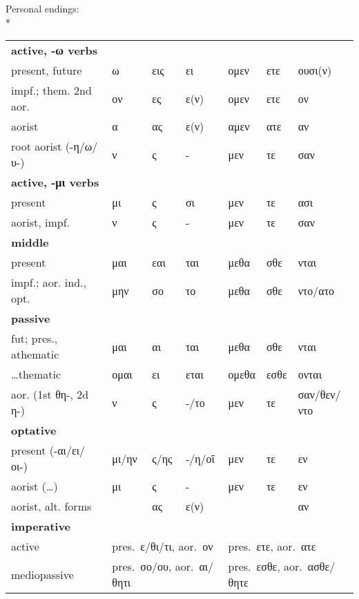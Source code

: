 \begin{small}
Personal endings:\\*
%
\begin{tabular}{lllllll}
\textbf{active, -ω verbs}\\
present, future              & ω      & εις\footnotemark  & ει\footnotemark[3]  & ομεν    & ετε    & ουσι(ν) \\
impf.; them. 2nd aor.        & ον\footnotemark[4] & ες      & ε(ν)      & ομεν    &	ετε    & ον\footnotemark[4] \\
aorist                       & α      & ας      & ε(ν)      & αμεν    & ατε    & αν\footnotemark[5] \\
root aorist (-η/ω/υ-)        & \tca{}ν & \tca{}ς  & \tca{}-  & \tca{}μεν & \tca{}τε & \tca{}σαν \\
\textbf{active, -μι verbs}\\
present                      & μι     & ς       & σι        & μεν     & τε     & ασι \\
aorist, impf.                & \tca{}ν & \tca{}ς  & \tca{}-  & \tca{}μεν & \tca{}τε & \tca{}σαν \\
\textbf{middle}\\
present                      & \tcb{}μαι & εαι  & \tcb{}ται & \tcb{}μεθα & \tcb{}σθε & \tcb{}νται \\
impf.; aor. ind., opt.       & μην    & σο      & το        & μεθα    &	σθε    & ντο/ατο\\
\textbf{passive}\\
fut; pres., athematic        & \tcb{}μαι  & αι  & \tcb{}ται & \tcb{}μεθα & \tcb{}σθε & \tcb{}νται \\
\ldots thematic              & ομαι   & ει\footnotemark[3] & εται      & ομεθα   & εσθε   & ονται \\
aor. (1st θη-, 2d η-)        & \tca{}ν & \tca{}ς  & \tca{}-/το  & \tca{}μεν & \tca{}τε & \tca{}σαν/θεν/ντο \\
\textbf{optative}\\
present (-αι/ει/οι-)         & μι/ην  & ς/ης    & -/η/οῖ    & μεν     & τε     & εν \\
aorist (\ldots)              & μι     & ς       & -         & μεν     & τε     & εν \\
aorist, alt. forms           &        & ας      & ε(ν)      &         &        & αν \\
\textbf{imperative}\\
active                       &  \multicolumn{3}{l}{pres.~ε/θι/τι\footnotemark[6], aor.~ον}   & \multicolumn{3}{l}{pres.~ετε, aor.~ατε }      \\
mediopassive                 &  \multicolumn{3}{l}{pres.~σο/ου, aor.~αι/θητι}                & \multicolumn{3}{l}{pres.~εσθε, aor.~ασθε/θητε }     \\
\end{tabular}


\end{small}
